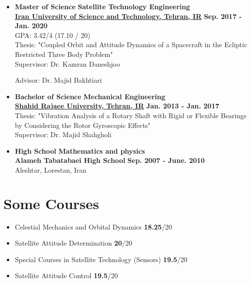\documentclass[10pt,a4paper,times]{moderncv}
\begin{document}
\begin{itemize}
	\item \textbf{Master of Science} \hfill \textbf{Satellite Technology Engineering} \\
	\href{http://www.iust.ac.ir/en}{\textbf{Iran University of Science and Technology, Tehran, IR}} \hfill \textbf{Sep. 2017 - Jan. 2020}\\ GPA: 3.42/4 (17.10 / 20) \\ Thesis: "Coupled Orbit and Attitude Dynamics of a Spacecraft in the Ecliptic Restricted Three Body Problem" \\ Supervisor: Dr. Kamran Daneshjoo
	\par 
	Advisor: Dr. Majid Bakhtiari
	\item \textbf{Bachelor of Science} \hfill \textbf{Mechanical Engineering} \\
	\href{https://sru.ac.ir/en}{\textbf{Shahid Rajaee University, Tehran, IR}} \hfill \textbf{Jan. 2013 - Jan. 2017} \\  Thesis: "Vibration Analysis of a Rotary Shaft with Rigid or Flexible Bearings by Considering the Rotor Gyroscopic Effects" \\ Supervisor: Dr. Majid Shahgholi
	
	
	\item \textbf{High School} \hfill \textbf{Mathematics and physics } \\
	{\textbf{Alameh Tabatabaei High School}} \hfill \textbf{Sep. 2007 - June. 2010} \\ Aleshtar, Lorestan, Iran   %
\end{itemize}

\section{Some Courses}
\begin{multicols}{2}  %
	\begin{itemize}
		\item Celestial Mechanics and Orbital Dynamics   	 	\hfill{\textbf{18.25}/20}
		\item Satellite Attitude Determination  		    	\hfill{\textbf{20}/20}              
		\item Special Courses in Satellite Technology (Sensors)	\hfill{\textbf{19.5}/20}
		\item Satellite Attitude Control            	 		\hfill{\textbf{19.5}/20} 
	\end{itemize}
\end{multicols}
\end{document}
